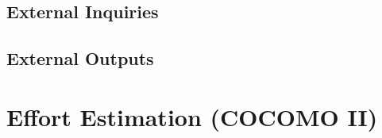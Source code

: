 \documentclass[\mainpath/main]{subfiles}
\begin{document}
\subsection{External Inquiries}

\subsection{External Outputs}


\section{Effort Estimation (COCOMO II)}
\label{ProjectEstimation:EffortEstimation}
\end{document}
